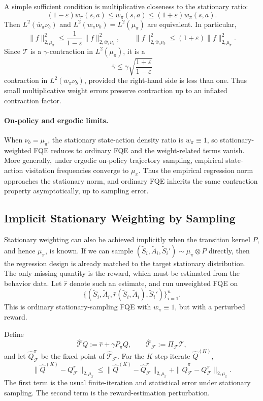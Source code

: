 \documentclass{article}
\theoremstyle{plain}
\theoremstyle{definition}
\theoremstyle{remark}
\begin{document}
A simple sufficient condition is multiplicative closeness to the stationary
ratio:
\[
(1-\varepsilon)w_\pi(s,a)
\le
\overline w_\pi(s,a)
\le
(1+\varepsilon)w_\pi(s,a).
\]
Then \(L^2(\overline w_\pi\nu_b)\) and \(L^2(w_\pi\nu_b)=L^2(\mu_\pi)\) are
equivalent. In particular,
\[
\|f\|_{2,\mu_\pi}^2
\le
\frac{1}{1-\varepsilon}\|f\|_{2,\overline w_\pi\nu_b}^2,
\qquad
\|f\|_{2,\overline w_\pi\nu_b}^2
\le
(1+\varepsilon)\|f\|_{2,\mu_\pi}^2 .
\]
Since \(\mathcal T\) is a \(\gamma\)-contraction in \(L^2(\mu_\pi)\), it is a
\[
\overline\gamma
\le
\gamma\sqrt{\frac{1+\varepsilon}{1-\varepsilon}}
\]
contraction in \(L^2(\overline w_\pi\nu_b)\), provided the right-hand side is
less than one. Thus small multiplicative weight errors preserve contraction up
to an inflated contraction factor.

\paragraph{On-policy and ergodic limits.}
When \(\nu_b=\mu_\pi\), the stationary state-action density ratio is
\(w_\pi\equiv1\), so stationary-weighted FQE reduces to ordinary FQE and the
weight-related terms vanish. More generally, under ergodic on-policy trajectory
sampling, empirical state-action visitation frequencies converge to
\(\mu_\pi\). Thus the empirical regression norm approaches the stationary norm,
and ordinary FQE inherits the same contraction property asymptotically, up to
sampling error.

\subsection{Implicit Stationary Weighting by Sampling}
\label{app:implicit-stationary-sampling}

Stationary weighting can also be achieved implicitly when the transition kernel
\(P\), and hence \(\mu_\pi\), is known. If we can sample
\((\widetilde S_i,\widetilde A_i,\widetilde S_i')\sim \mu_\pi\otimes P\)
directly, then the regression design is already matched to the target
stationary distribution. The only missing quantity is the reward, which must be
estimated from the behavior data. Let \(\widehat r\) denote such an estimate,
and run unweighted FQE on
\[
\{(\widetilde S_i,\widetilde A_i,
\widehat r(\widetilde S_i,\widetilde A_i),\widetilde S_i')\}_{i=1}^n .
\]
This is ordinary stationary-sampling FQE with \(w_\pi\equiv 1\), but with a
perturbed reward.

Define
\[
\widehat{\mathcal T}Q:=\widehat r+\gamma P_\pi Q,
\qquad
\widehat{\mathcal T}_{\mathcal F}:=\Pi_{\mathcal F}\widehat{\mathcal T},
\]
and let \(\widehat Q^\pi_{\mathcal F}\) be the fixed point of
\(\widehat{\mathcal T}_{\mathcal F}\). For the \(K\)-step iterate
\(\widehat Q^{(K)}\),
\[
\|\widehat Q^{(K)}-Q^\pi_{\mathcal F}\|_{2,\mu_\pi}
\le
\|\widehat Q^{(K)}-\widehat Q^\pi_{\mathcal F}\|_{2,\mu_\pi}
+
\|\widehat Q^\pi_{\mathcal F}-Q^\pi_{\mathcal F}\|_{2,\mu_\pi}.
\]
The first term is the usual finite-iteration and statistical error under
stationary sampling. The second term is the reward-estimation perturbation.
\end{document}
